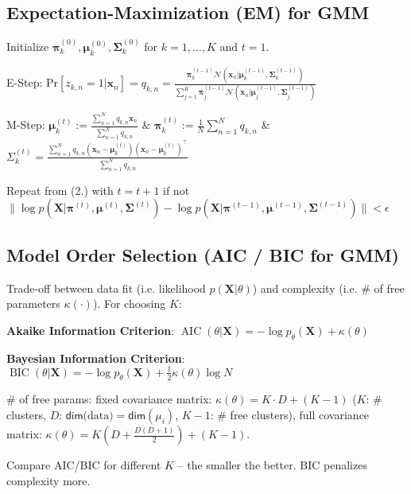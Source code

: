 \documentclass[a4paper, 11pt, landscape]{article}
\begin{document}
\begin{multicols*}{3}
\subsection{Expectation-Maximization (EM) for GMM}
\begin{compactenum}
	\item Initialize $\boldsymbol{\pi}_k^{(0)}, \boldsymbol{\mu}_k^{(0)}, \boldsymbol{\Sigma}_k^{(0)}$ for $k = 1, \ldots, K$ and $t=1$.
	\item E-Step: Pr$[z_{k,n} = 1 | \mathbf{x}_n] = q_{k, n} = \frac{\boldsymbol{\pi}_k^{(t-1)} \mathcal{N}(\mathbf{x}_n | \boldsymbol{\mu}_k^{(t-1)}, \boldsymbol{\Sigma}_k^{(t-1)})}{\sum_{j=1}^K \boldsymbol{\pi}_j^{(t-1)} \mathcal{N}(\mathbf{x}_n | \boldsymbol{\mu}_j^{(t-1)}, \boldsymbol{\Sigma}_j^{(t-1)})}$
	\item M-Step: $\boldsymbol{\mu}_k^{(t)} := \frac{\sum_{n=1}^N q_{k,n} \mathbf{x}_n}{\sum_{n=1}^N q_{k,n}}$\hspace{20pt} \& \hspace{20pt} $\boldsymbol{\pi}_k^{(t)} := \frac{1}{N} \sum_{n=1}^N q_{k,n}$ \hspace{20pt} \& \hspace{20pt} $\Sigma_k^{(t)} = \frac{\sum_{n=1}^N q_{k, n} (\mathbf{x}_n - \boldsymbol{\mu}_k^{(t)})(\mathbf{x}_n - \boldsymbol{\mu}_k^{(t)})^\top}{\sum_{n=1}^N q_{k,n}}$
	\item Repeat from (2.) with $t = t + 1$ if not $\| \log p(\mathbf{X} | \boldsymbol{\pi}^{(t)}, \boldsymbol{\mu}^{(t)}, \boldsymbol{\Sigma}^{(t)}) - \log p(\mathbf{X} | \boldsymbol{\pi}^{(t-1)}, \boldsymbol{\mu}^{(t-1)}, \boldsymbol{\Sigma}^{(t-1)}) \| < \epsilon$
\end{compactenum}

\subsection{Model Order Selection (AIC / BIC for GMM)}
Trade-off between data fit (i.e. likelihood $p(\mathbf{X} | \theta)$) and complexity (i.e. \# of free parameters $\kappa(\cdot)$). For choosing $K$:
\begin{inparaitem}[\color{red}\textbullet]
	\item \textbf{Akaike Information Criterion}: $\operatorname{AIC}(\theta | \mathbf{X}) = -\log p_\theta(\mathbf{X}) + \kappa(\theta)$
	\item \textbf{Bayesian Information Criterion}: $\operatorname{BIC}(\theta | \mathbf{X}) = -\log p_\theta(\mathbf{X}) + \frac{1}{2} \kappa(\theta) \log N$
	\item \# of free params: fixed covariance matrix: $\kappa(\theta) = K \cdot D + (K - 1)$ ($K$: \# clusters, $D$: $\mathsf{dim}\text{(data)}=\mathsf{dim}(\mu_i)$, $K-1$: \# free clusters), full covariance matrix: $\kappa(\theta) = K(D + \frac{D(D+1)}{2}) + (K - 1)$.
	\item Compare AIC/BIC for different $K$ -- the smaller the better. BIC penalizes complexity more.
\end{inparaitem}


\end{multicols*}
\end{document}
